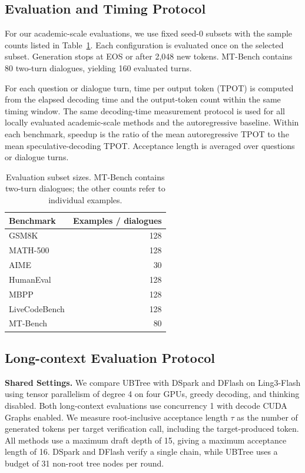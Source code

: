 \subsection{Evaluation and Timing Protocol}
\label{app:evaluation-protocol}

For our academic-scale evaluations, we use fixed seed-0 subsets with the sample counts listed in Table~\ref{tab:evaluation-samples}. Each configuration is evaluated once on the selected subset. Generation stops at EOS or after 2,048 new tokens. MT-Bench contains 80 two-turn dialogues, yielding 160 evaluated turns.

For each question or dialogue turn, time per output token (TPOT) is computed from the elapsed decoding time and the output-token count within the same timing window. The same decoding-time measurement protocol is used for all locally evaluated academic-scale methods and the autoregressive baseline. Within each benchmark, speedup is the ratio of the mean autoregressive TPOT to the mean speculative-decoding TPOT. Acceptance length is averaged over questions or dialogue turns.

\begin{table}[t]
\centering
\caption{Evaluation subset sizes. MT-Bench contains two-turn dialogues; the other counts refer to individual examples.}
\label{tab:evaluation-samples}
\begin{tabular}{lr}
\toprule
Benchmark & Examples / dialogues \\
\midrule
GSM8K & 128 \\
MATH-500 & 128 \\
AIME & 30 \\
HumanEval & 128 \\
MBPP & 128 \\
LiveCodeBench & 128 \\
MT-Bench & 80 \\
\bottomrule
\end{tabular}
\end{table}

\subsection{Long-context Evaluation Protocol}
\label{app:long-context-protocol}

\noindent\textbf{Shared Settings.}
We compare UBTree with DSpark and DFlash on Ling3-Flash using tensor parallelism of degree 4 on four GPUs, greedy decoding, and thinking disabled. Both long-context evaluations use concurrency 1 with decode CUDA Graphs enabled. We measure root-inclusive acceptance length $\tau$ as the number of generated tokens per target verification call, including the target-produced token. All methods use a maximum draft depth of 15, giving a maximum acceptance length of 16. DSpark and DFlash verify a single chain, while UBTree uses a budget of 31 non-root tree nodes per round.

